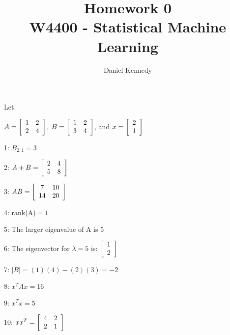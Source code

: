 \documentclass[11pt]{article}
\title{Homework 0 \large \\ W4400 - Statistical Machine Learning}
\author{Daniel Kennedy}
\begin{document}
\maketitle

Let:

$A=
\left[ \begin {array}{cc} 
1&2\cr2&4
\end {array} \right]
$,\qquad
$B=
\left[ \begin {array}{cc} 
1&2\cr3&4
\end {array} \right]
$, and \qquad
$x=
\left[ \begin {array}{c} 
2\cr1
\end {array} \right]
$

\vspace{5 mm}

1: \qquad
$B_{2,1}=3$

2: \qquad
$A+B=
\left[ \begin {array}{cc} 
2&4\cr5&8
\end {array} \right]
$

3: \qquad
$AB=
\left[ \begin {array}{cc} 
7&10\cr14&20
\end {array} \right]
$

4: \qquad
rank(A)$=1$

5: \qquad
The larger eigenvalue of A is $5$

6: \qquad
The eigenvector for $\lambda = 5$ is:
$\left[ \begin {array}{c} 
1\cr2
\end {array} \right]$

7: \qquad
$\left| B \right|=(1)(4)-(2)(3)=-2$

8: \qquad
$x^TAx=16$

9: \qquad
$x^Tx=5$

10: \qquad
$xx^T=
\left[ \begin {array}{cc} 
4&2\cr2&1
\end {array} \right]$
\end{document}

